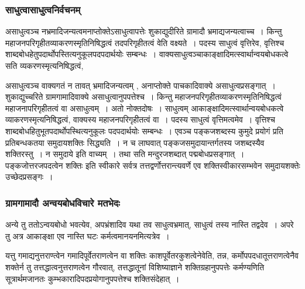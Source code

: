 			\subsubsection{साधुत्वासाधुत्वनिर्वचनम्}
			
				\begin{small}
			
					असाधुत्वञ्च  नभ्रमादिजन्यत्वमनाप्तोक्तेऽसाधुत्वापत्तेः शुकाद्युदीरिते ग्रामादौ भ्रमाद्यजन्यत्वाच्च~। किन्तु महाजनपरिगृहीतव्याकरणस्मृतिनिषिद्धत्वं तदपरिगृहीतत्वं वेति वक्ष्यते~। पदस्य साधुत्वं वृत्तिरेव, वृत्तिश्च शाब्दबोधहेतुपदार्थोपस्तित्यनुकूलपदपदार्थयोः सम्बन्धः~। वाक्यसाधुत्वञ्चाकाङ्क्षादिमत्स्वार्थान्वयबोधकत्वे सति व्यकरणस्मृत्यनिषिद्धत्वं, 
				\end{small}
			
				असाधुत्वञ्च वाक्यगतं न तावत् भ्रमादिजन्यत्वम् , अनाप्तोक्ते पाचकादिवाक्ये असाधुत्वप्रसङ्गात्~। शुकाद्युच्चरिते ग्रामगामादिवाक्ये असाधुत्वानुपपत्तेश्च~। किन्तु महाजनपरिगृहीतव्याकरणस्मृतिनिषिद्धत्वं महाजनापरिगृहीतत्वं वा असाधुत्वम्~। अतो नोक्तदोषः~। साधुत्वम् आकाङ्क्षादिमत्स्वार्थान्वयबोधकत्वे व्याकरणस्मृत्यनिषिद्धत्वं, वाक्यस्य महाजनपरिगृहीतत्वं वा~। पदस्य साधुत्वं वृत्तिमत्वमेव~। वृत्तिश्च शाब्दबोधहितुभूतपदार्थोपस्थित्यनुकूलः पदपदार्थयोः सम्बन्धः~। एवञ्च पङ्कजशब्दस्य कुमुदे प्रयोगं प्रति प्रतिबन्धकतया समुदायशक्तिः सिद्ध्यति~। न च लाघवात् पङ्कजसमुदायान्तर्गतस्य जशब्दस्यैव शक्तिरस्तु~। न समुदाये इति वाच्यम्~। तथा सति मन्दुरजशब्दात् पद्मबोधप्रसङ्गात्~। पङ्कजोत्तरजपदत्वेन शक्तिः इति स्वीकारे सर्वत्र तत्तद्वर्णोत्तरान्त्यवर्णे एव शक्तिस्वीकारसम्भवेन समुदायशक्तेः उच्छेदप्रसङ्गः~। 
			
			\subsubsection{ग्रामगामादौ अन्वयबोधविचारे मतभेदः}
			
				\begin{small}
			
					अन्ये तु ततोऽन्वयबोधो भवत्येव, अपभ्रंशादिव यथा तव साधुत्वभ्रमात्, साधुत्वं तस्य नास्ति तद्वदेव~। अपरे तु अत्र आकाङ्क्षा एव नास्ति घटः कर्मत्वमानयनमित्यत्रेव~।
 
					यत्तु गमाद्यनुत्तराण्त्वेन गमादिपूर्वेतराणत्वेन वा शक्तिः काशपूर्वेतरकुशत्वेनेवेति, तन्न, कर्मोपपदधातूत्तराणत्वेनैव शक्तेर्न तु तत्तद्धात्वनुत्तराणत्वेन गौरवात्, तत्तद्धातूनां विशिष्याज्ञाने शक्तिग्रहानुपपत्तेः कर्मण्यणिति सूत्रार्थमजानतः कुम्भकारादिपदप्रयोगानुपपत्तेश्च शक्तिसंदेहात्~।    
				\end{small}
			
